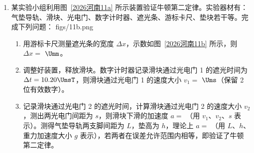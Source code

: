 \documentclass[\gkver]{gaokaozhenti}
\begin{document}
\begin{enumerate}
{$X_{7}-X_{6}=X_{8}-X_{7}=X_{9}-X_{8}=6\Um$

故 $0\sim8\Us$ 内 N 做匀加速直线运动，同理 $10\sim18\Us$ 内 N 以另一加速度做匀减速直线运动，$8\Us$ 至 $10\Us$ 内的某时刻，N 匀加速运动结束开始做匀减速，所以 $8\sim10\Us$ 内的某时刻，N 的速度达到最大值，设加速阶段的加速度为 $a_{1}$，则由 $\Delta x=a_{1}T^{2}=-10\Um$

可得 $a_{1}=-2.5\Umsq$

设减速阶段的加速度为 $a_{2}$，则由 $\Delta x'=a_{2}T^{2}=6\Um$

解得 $a_{2}=1.5\Umsq$

以 M 飞行器为参考系，N 在第 $6\Us$ 时的速度 $v_{6}=\frac{X_{3}+X_{4}}{2T}=-6\Ums$

第 $12\Us$ 时的速度 $v_{12}=\frac{X_{6}+X_{7}}{2T}=-9\Ums$

则由 $v_{6}+a_{1}t=v_{12}-a_{2}(6\Us-t)$

解得 $t=3\Us$

即第 $9\Us$ 时 N 的速度最大，N 相对于 M 的速度最大值为 $v=v_{6}+a_{1}t=-13.5\Ums$，故 A 错误，CD 正确；

B．$7\Us$ 末时 N 与 M 的间距为

$x=290\Um+v_{6}\times1\Us+\frac{1}{2}a_{1}(1\Us)^{2}=282.75\Um$

故 B 错误。

故选 CD。
}

\item
某实验小组利用图~\ref{2026河南11a} 所示装置验证牛顿第二定律。实验器材有：气垫导轨、滑块、光电门、数字计时器、遮光条、游标卡尺、垫块若干等。完成下列问题：
{figs/11b.png}
\begin{enumerate}
	\item
	用游标卡尺测量遮光条的宽度 $\Delta x$，示数如图~\ref{2026河南11b} 所示，则 $\Delta x=$  $\Umm$。
	\item
	调整好装置，释放滑块。数字计时器记录滑块通过光电门 1 的遮光时间为 $\Delta t=10.20\UmsT$，则滑块通过光电门 1 的速度大小 $v_{1}=$  $\Ums$（保留 2 位有效数字）。
	\item
	记录滑块通过光电门 2 的遮光时间，计算滑块通过光电门 2 的速度大小 $v_{2}$，测出两光电门间距为 $s$，则滑块下滑的加速度 $a=$ （用 $v_{1}$、$v_{2}$、$s$ 表示）。测得气垫导轨两支脚间距为 $L$，垫高为 $h$，理论上 $a=$ （用 $L$、$h$、重力加速度大小 $g$ 表示），若两者在误差允许范围内相等，即验证了牛顿第二定律。
\end{enumerate}


\end{enumerate}
\end{document}
